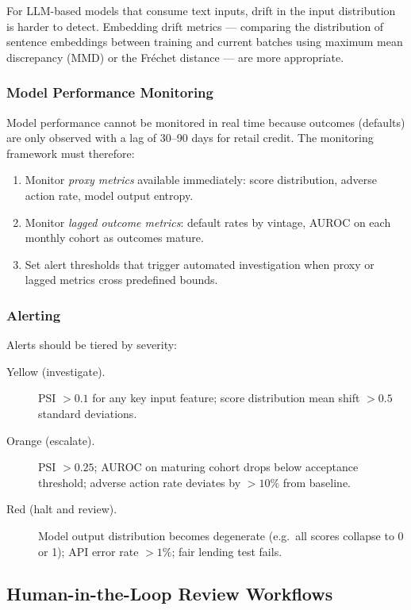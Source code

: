 \begin{context}
For LLM-based models that consume text inputs, drift in the input distribution is harder to detect. Embedding drift metrics --- comparing the distribution of sentence embeddings between training and current batches using maximum mean discrepancy (MMD) or the Fr\'{e}chet distance --- are more appropriate.

\subsubsection*{Model Performance Monitoring}

Model performance cannot be monitored in real time because outcomes (defaults) are only observed with a lag of 30--90 days for retail credit. The monitoring framework must therefore:

\begin{enumerate}
  \item Monitor \emph{proxy metrics} available immediately: score distribution, adverse action rate, model output entropy.
  \item Monitor \emph{lagged outcome metrics}: default rates by vintage, AUROC on each monthly cohort as outcomes mature.
  \item Set alert thresholds that trigger automated investigation when proxy or lagged metrics cross predefined bounds.
\end{enumerate}

\subsubsection*{Alerting}

Alerts should be tiered by severity:
\begin{description}
  \item[Yellow (investigate).] PSI $> 0.1$ for any key input feature; score distribution mean shift $> 0.5$ standard deviations.
  \item[Orange (escalate).] PSI $> 0.25$; AUROC on maturing cohort drops below acceptance threshold; adverse action rate deviates by $> 10\%$ from baseline.
  \item[Red (halt and review).] Model output distribution becomes degenerate (e.g.\ all scores collapse to 0 or 1); API error rate $> 1\%$; fair lending test fails.
\end{description}

\subsection{Human-in-the-Loop Review Workflows}
\label{subsec:hitl-credit}


\end{context}
